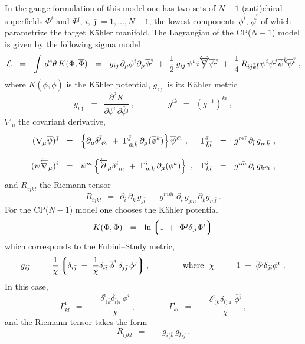 \documentclass[12pt]{article}
\newcommand{\p}{\partial}
\newcommand{\ov}{\overline}
\newcommand{\mc}[1]{\mathcal{#1}}
\newcommand{\lgr}{\left\lgroup}
\newcommand{\rgr}{\right\rgroup}
\def\slashed#1{\setbox0=\hbox{$#1$}             %
   \dimen0=\wd0                                 %
   \setbox1=\hbox{/} \dimen1=\wd1               %
   \ifdim\dimen0>\dimen1                        %
      \rlap{\hbox to \dimen0{\hfil/\hfil}}      %
      #1                                        %
   \else                                        %
      \rlap{\hbox to \dimen1{\hfil$#1$\hfil}}   %
      /                                         %
   \fi}                                        %
\newcommand{\bi}{{\bar \imath}}
\newcommand{\bj}{{\bar \jmath}}
\newcommand{\bk}{{\bar k}}
\newcommand{\bl}{{\bar l}}
\newcommand{\bm}{{\bar m}}
\begin{document}
	In the gauge formulation of this model one has two sets of $ N - 1 $ (anti)chiral 
	superfields $ \Phi^i $ and $ \ov{\Phi}{}^\bj $, $ i, \bj = 1,..., N-1 $, 
	the lowest components $ \phi^i $, $ \ov{\phi}^\bj $ of which parametrize the target K\"{a}hler
	manifold.
The Lagrangian of the CP($N-1$) model is given by the following sigma model
\[
	\mc{L} ~~=~~ \int\, d^4\theta\, K(\Phi,\ov{\Phi}) ~~=~~ g_{i\bj}\,\p_\mu \phi^i \p_\mu\ov{\phi}{}^\bj
		~+~ \frac{1}{2}\, g_{i\bj}\, \psi^i\, i\overleftrightarrow{\slashed{\nabla}} \ov{\psi}{}^\bj 
		~+~ \frac{1}{4}\, R_{ij\bk\bl}\, \psi^i\psi^j \ov{\psi}{}^\bk \ov{\psi}{}^\bl~,
\]
	where $ K(\phi,\ov{\phi}) $ is the K\"ahler potential, 
	$ g_{i\bj} $ is its K\"ahler metric
\[
	g_{i\bj} ~~=~~ \frac{\p^2 K}{\p\phi^i\,{\p\ov{\phi}{}^\bj}}~,
	\qquad\qquad
	g^{i\bk} ~~=~~ \left(g^{-1}\right)^{\bk i}~,
\]
	$ \nabla_\mu $ the covariant derivative,
\begin{align}
% 
\notag
	(\nabla_\mu \ov{\psi})^\bj & ~~=~~ \left\{ \p_\mu \delta^\bj_{\ \bm} ~+~
						\Gamma_{\bm\bk}^\bj\, \p_\mu(\ov{\phi}{}^\bk) \right\} \ov{\psi}{}^\bm~,
	& \Gamma^\bi_{\bk\bl} & ~~=~~ g^{m\bi}\,\p_\bl\, g_{m\bk}~,
	\\[3mm]
%
\label{covd}
	(\psi \overleftarrow{\nabla}{}_\mu)^i & ~~=~~ 
			\psi^m \left\{ \overleftarrow{\p}{}_\mu\delta^i_{\ m} ~+~
						\Gamma^i_{mk}\, \p_\mu(\phi^k) \right\}~,
	& \Gamma^i_{kl} & ~~=~~ g^{i\bm}\, \p_l\, g_{k\bm}~,
\end{align}
	and $ R_{ij\bk\bl} $ the Riemann tensor 
\[
	R_{ij\bk\bl} ~~=~~ \p_i\,\p_\bk\, g_{j\bl} ~-~ g^{m\bm}\; \p_i\, g_{j\bm}\, \p_\bk g_{m\bl}~.
\]
	For the CP($N-1$) model one chooses the K\"ahler potential
\[
	K(\Phi, \ov{\Phi}) ~~=~~ \ln \lgr 1 ~+~ \ov{\Phi}{}^\bj \delta_{\bj i} \Phi^i \rgr
\]
	which corresponds to the Fubini--Study metric,
\[
	g_{i\bj} ~~=~~ \frac{1}{\chi}\lgr  \delta_{i\bj} ~-~ \frac{1}{\chi}
				  \delta_{i\bi}\,\ov{\phi}^\bi\, \delta_{j\bj}\,\phi^j \rgr,
	\qquad\qquad \text{where~~}
	\chi ~~=~~ 1 ~+~ \ov{\phi}{}^\bj \delta_{\bj i} \phi^i~.
\]
	In this case,
\[
	\Gamma^\bi_{\bk\bl} ~~=~~ -\, \frac{\delta^\bi_{\ (\bk} \delta_{\bl) i}\, \phi^i}{\chi}\,,  
	\qquad\qquad 
	\Gamma^i_{kl} ~~=~~ -\, \frac{\delta^i_{\ (k} \delta_{l)\bi}\,\ov{\phi}{}^\bi}{\chi}\,,
\]
	and the Riemann tensor takes the form
\[
	R_{ij\bk\bl} ~~=~~ -\,g_{i(\bk}\,g_{\bl)j}~.
\]
	
\end{document}
